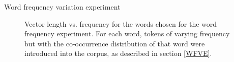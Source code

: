 \documentclass{article} %
\begin{document}
\begin{section}{Word frequency variation experiment}
\begin{figure}\label{fig:word-frequency-experiment-graph}
	\caption{
	Vector length vs. frequency for the words chosen for the word frequency
	experiment.  For each word, tokens of varying frequency but with the
	co-occurrence distribution of that word were introduced into the
	corpus, as described in section \ref{WFVE}.
	}
\end{figure}

\end{section}
\end{document}
